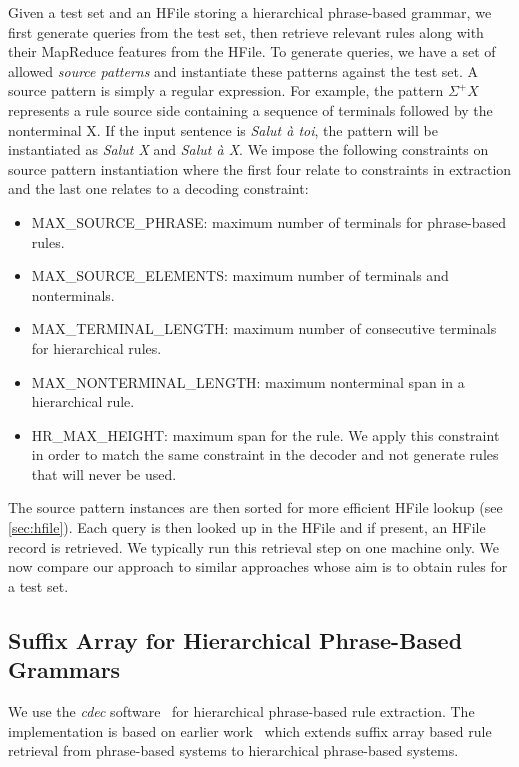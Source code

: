 Given a test set and an HFile storing a hierarchical phrase-based grammar, we
first generate queries from the test set, then retrieve relevant rules along
with their MapReduce features from the HFile. To generate queries, we have a set
of allowed \emph{source patterns} and instantiate these patterns against the
test set. A source pattern is simply a regular expression. For example, the
pattern $\Sigma^+X$ represents a rule source side containing a sequence of
terminals followed by the nonterminal X. If the input sentence is
\emph{Salut à toi}, the pattern will be instantiated as \emph{Salut X} and
\emph{Salut à X}. We impose the following constraints on source pattern
instantiation where the first four relate to constraints in extraction and the
last one relates to a decoding constraint:
%
\begin{itemize}
  \item MAX\_SOURCE\_PHRASE: maximum number of terminals for phrase-based rules.
  \item MAX\_SOURCE\_ELEMENTS: maximum number of terminals and nonterminals.
  \item MAX\_TERMINAL\_LENGTH: maximum number of consecutive terminals for
    hierarchical rules.
  \item MAX\_NONTERMINAL\_LENGTH: maximum nonterminal span in a hierarchical
    rule.
  \item HR\_MAX\_HEIGHT: maximum span for the rule. We apply this constraint
    in order to match the same constraint in the decoder and not generate rules
    that will never be used.
\end{itemize}
%
The source pattern instances are then sorted for more efficient HFile lookup
(see \autoref{sec:hfile}). Each query is then looked up in the HFile and if
present, an HFile record is retrieved. We typically run this retrieval step on
one machine only. We now compare our approach to similar approaches whose aim is
to obtain rules for a test set.

\subsection{Suffix Array for Hierarchical Phrase-Based Grammars}

We use the \emph{cdec}
software~\citep{dyer-lopez-ganitkevitch-weese-ture-blunsom-setiawan-eidelman-resnik:2010:ACL}
for hierarchical phrase-based rule extraction. The implementation is based on
earlier work~\citep{lopez:2007:EMNLP-CoNLL} which extends suffix array based
rule retrieval from phrase-based systems to hierarchical phrase-based systems.

